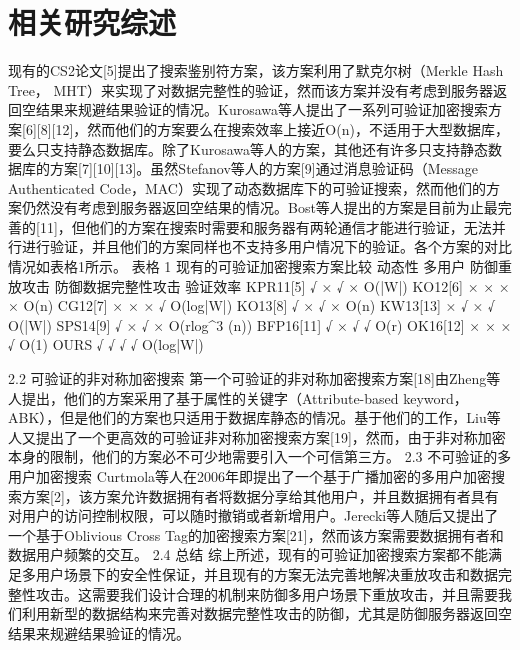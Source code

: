 \chapter{相关研究综述}
\label{cha:related}
现有的CS2论文[5]提出了搜索鉴别符方案，该方案利用了默克尔树（Merkle Hash Tree， MHT）来实现了对数据完整性的验证，然而该方案并没有考虑到服务器返回空结果来规避结果验证的情况。Kurosawa等人提出了一系列可验证加密搜索方案[6][8][12]，然而他们的方案要么在搜索效率上接近O(n)，不适用于大型数据库，要么只支持静态数据库。除了Kurosawa等人的方案，其他还有许多只支持静态数据库的方案[7][10][13]。虽然Stefanov等人的方案[9]通过消息验证码（Message Authenticated Code，MAC）实现了动态数据库下的可验证搜索，然而他们的方案仍然没有考虑到服务器返回空结果的情况。Bost等人提出的方案是目前为止最完善的[11]，但他们的方案在搜索时需要和服务器有两轮通信才能进行验证，无法并行进行验证，并且他们的方案同样也不支持多用户情况下的验证。各个方案的对比情况如表格1所示。
表格 1 现有的可验证加密搜索方案比较
	动态性	多用户	防御重放攻击	防御数据完整性攻击	验证效率
KPR11[5]	√	×	√	×	O(|W|)
KO12[6]	×	×	×	×	O(n)
CG12[7]	×	×	×	√	O(log|W|)
KO13[8]	√	×	√	×	O(n)
KW13[13]	×	√	×	√	O(|W|)
SPS14[9]	√	×	√	×	O(rlog^3 (n))
BFP16[11]	√	×	√	√	O(r)
OK16[12]	×	×	×	√	O(1)
OURS	√	√	√	√	O(log|W|)

2.2 可验证的非对称加密搜索
第一个可验证的非对称加密搜索方案[18]由Zheng等人提出，他们的方案采用了基于属性的关键字（Attribute-based keyword，ABK），但是他们的方案也只适用于数据库静态的情况。基于他们的工作，Liu等人又提出了一个更高效的可验证非对称加密搜索方案[19]，然而，由于非对称加密本身的限制，他们的方案必不可少地需要引入一个可信第三方。
2.3 不可验证的多用户加密搜索
	Curtmola等人在2006年即提出了一个基于广播加密的多用户加密搜索方案[2]，该方案允许数据拥有者将数据分享给其他用户，并且数据拥有者具有对用户的访问控制权限，可以随时撤销或者新增用户。Jerecki等人随后又提出了一个基于Oblivious Cross Tag的加密搜索方案[21]，然而该方案需要数据拥有者和数据用户频繁的交互。
2.4 总结
	综上所述，现有的可验证加密搜索方案都不能满足多用户场景下的安全性保证，并且现有的方案无法完善地解决重放攻击和数据完整性攻击。这需要我们设计合理的机制来防御多用户场景下重放攻击，并且需要我们利用新型的数据结构来完善对数据完整性攻击的防御，尤其是防御服务器返回空结果来规避结果验证的情况。


